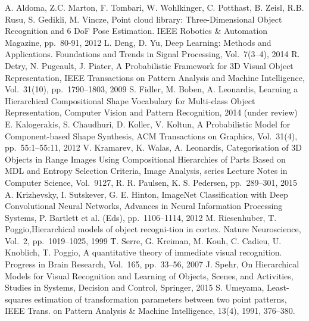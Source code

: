 \documentclass[letterpaper,10pt,conference]{ieeeconf}  %
\begin{document}

\begin{thebibliography}{99}
A. Aldoma, Z.C. Marton, F. Tombari, W. Wohlkinger, C. Potthast, B. Zeisl, R.B. Rusu, S. Gedikli, M. Vincze, Point cloud library: Three-Dimensional Object Recognition and 6 DoF Pose Estimation. IEEE Robotics \& Automation Magazine, pp.~80-91, 2012
L. Deng, D. Yu, Deep Learning: Methods and Applications. Foundations and Trends in Signal Processing, Vol.~7(3--4), 2014
R. Detry, N. Pugeault, J. Piater, A Probabilistic Framework for 3D Visual Object Representation, IEEE Transactions on Pattern Analysis and Machine Intelligence, Vol.~31(10), pp.~1790--1803, 2009
S. Fidler, M. Boben, A. Leonardis, Learning a Hierarchical Compositional Shape Vocabulary for Multi-class Object Representation, Computer Vision and Pattern Recognition, 2014 (under review)
E. Kalogerakis, S. Chaudhuri, D. Koller, V. Koltun, A Probabilistic Model for Component-based Shape Synthesis, ACM Transactions on Graphics, Vol.~31(4), pp.~55:1--55:11, 2012
V. Kramarev, K. Walas, A. Leonardis, Categorisation of 3D Objects in Range Images Using Compositional Hierarchies of Parts Based on MDL and Entropy Selection Criteria, Image Analysis, series Lecture Notes in Computer Science, Vol.~9127, R. R. Paulsen, K. S. Pedersen, pp.~289--301, 2015
A. Krizhevsky, I. Sutskever, G. E. Hinton, ImageNet Classification with Deep Convolutional Neural Networks, Advances in Neural Information Processing Systems, P. Bartlett et al. (Eds), pp.~1106--1114, 2012
M. Riesenhuber, T. Poggio,Hierarchical models of object recogni-tion in cortex. Nature Neuroscience, Vol.~2, pp.~1019--1025, 1999
T. Serre, G. Kreiman, M. Kouh, C. Cadieu, U. Knoblich, T. Poggio, A quantitative theory of immediate visual recognition. Progress in
Brain Research, Vol.~165, pp.~33--56, 2007
J. Spehr, On Hierarchical Models for Visual Recognition and Learning of Objects, Scenes, and Activities, Studies in Systems, Decision and Control, Springer, 2015
 S. Umeyama, Least-squares estimation of transformation parameters between two point patterns, IEEE Trans. on Pattern Analysis \& Machine Intelligence, 13(4), 1991, 376--380.

\end{thebibliography}
\end{document}
